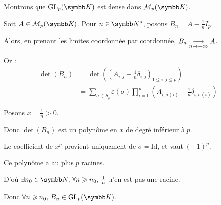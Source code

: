 \begin{exemple}
    Montrons que $\operatorname{GL}_p(\K)$ est dense dans $\mathcal M_p(\K)$.

    Soit $A \in \mathcal M_p(\K)$.
    Pour $n \in \N^*$, posons $B_n = A - \frac 1 n I_p$.

    Alors, en prenant les limites coordonnée par coordonnée, $B_n \underset{n \to +\infty}{\longrightarrow} A$.

    Or :
    \begin{align*}
        \det(B_n) & = \det\left(\left(A_{i, j} - \frac 1 n \delta_{i, j}\right)_{1 \leqslant i, j \leqslant p}\right) \\
        & = \sum_{ \sigma \in S_p} \varepsilon(\sigma) \prod_{i=1}^p \left(A_{i, \sigma(i)} - \frac 1 n \delta_{i, \sigma(i)}\right) 
    \end{align*}

    Posons $x = \frac 1 n > 0$. 

    Donc $\det(B_n) $ est un polynôme en $x$ de degré inférieur à $p$. 

    Le coefficient de $x^p$ provient uniquement de $\sigma = \text{Id}$, et vaut $(-1)^p$.

    Ce polynôme a au plus $p$ racines. 

    D'où $\exists n_0 \in \N, \, \forall n \geqslant n_0, \, \frac 1 n$ n'en est pas une racine. 

    Donc $\forall n \geqslant n_0, \, B_n \in \operatorname{GL}_p(\K)$. \\
\end{exemple}

